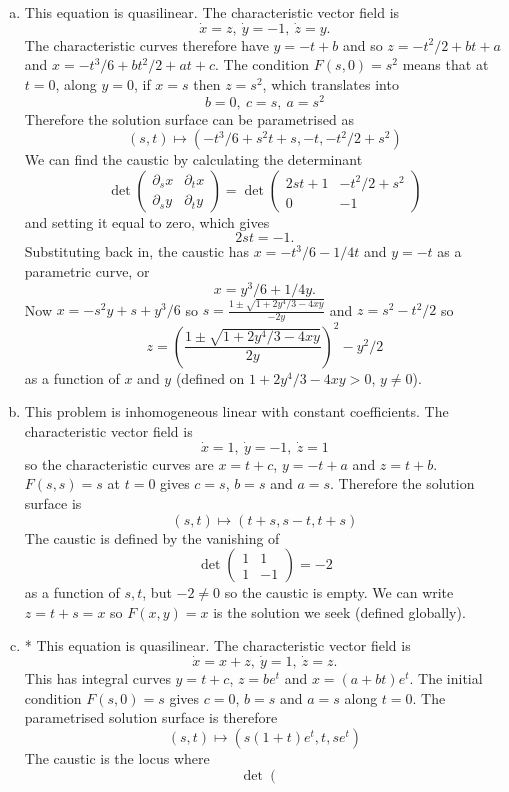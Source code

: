 \documentclass[12pt]{article}
\begin{document}
\begin{answer}
\begin{enumerate}[(a)]
\item This equation is quasilinear. The characteristic vector field is
\[\dot{x}=z,\ \dot{y}=-1,\ \dot{z}=y.\]
The characteristic curves therefore have $y=-t+b$ and so $z=-t^2/2+bt+a$ and $x=-t^3/6+bt^2/2+at+c$. The condition $F(s,0)=s^2$ means that at $t=0$, along $y=0$, if $x=s$ then $z=s^2$, which translates into
\[b=0,\ c=s,\ a=s^2\]
Therefore the solution surface can be parametrised as
\[(s,t)\mapsto (-t^3/6+s^2t+s,-t,-t^2/2+s^2)\]
We can find the caustic by calculating the determinant
\[\det\left(\begin{array}{cc}\partial_sx & \partial_tx\\\partial_sy & \partial_ty\end{array}\right)=\det\left(\begin{array}{cc}2st+1 & -t^2/2+s^2\\ 0 & -1\end{array}\right)\]
and setting it equal to zero, which gives
\[2st=-1.\]
Substituting back in, the caustic has $x=-t^3/6-1/4t$ and $y=-t$ as a parametric curve, or
\[x=y^3/6+1/4y.\]
Now $x=-s^2y+s+y^3/6$ so $s=\frac{1\pm\sqrt{1+2y^4/3-4xy}}{-2y}$ and $z=s^2-t^2/2$ so
\[z=\left(\frac{1\pm\sqrt{1+2y^4/3-4xy}}{2y}\right)^2-y^2/2\]
as a function of $x$ and $y$ (defined on $1+2y^4/3-4xy>0$, $y\neq 0$).
\item This problem is inhomogeneous linear with constant coefficients. The characteristic vector field is
\[\dot{x}=1,\ \dot{y}=-1,\ \dot{z}=1\]
so the characteristic curves are $x=t+c$, $y=-t+a$ and $z=t+b$. $F(s,s)=s$ at $t=0$ gives $c=s$, $b=s$ and $a=s$. Therefore the solution surface is
\[(s,t)\mapsto(t+s,s-t,t+s)\]
The caustic is defined by the vanishing of
\[\det\left(\begin{array}{cc}1 & 1\\ 1&-1\end{array}\right)=-2\]
as a function of $s,t$, but $-2\neq 0$ so the caustic is empty. We can write $z=t+s=x$ so $F(x,y)=x$ is the solution we seek (defined globally).
\item * This equation is quasilinear. The characteristic vector field is
\[\dot{x}=x+z,\ \dot{y}=1,\ \dot{z}=z.\]
This has integral curves $y=t+c$, $z=be^t$ and $x=(a+bt)e^t$. The initial condition $F(s,0)=s$ gives $c=0$, $b=s$ and $a=s$ along $t=0$. The parametrised solution surface is therefore
\[(s,t)\mapsto (s(1+t)e^t,t,se^t)\]
The caustic is the locus where
\[\det\left(\begin{array}{cc}

\end{array}\]
\end{enumerate}
\end{answer}
\end{document}
